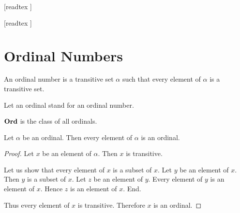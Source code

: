 \documentclass[10pt]{article}
\begin{document}
  \begin{imports}
    \begin{forthel}

      [readtex ]

      [readtex ]

    \end{forthel}
  \end{imports}


  \section{Ordinal Numbers}

  \begin{forthel}
    \begin{definition}
      An ordinal number is a transitive set $\alpha$ such that every element of
      $\alpha$ is a transitive set.
    \end{definition}

    Let an ordinal stand for an ordinal number.
  \end{forthel}

  \begin{forthel}
    \begin{definition}
      $\textbf{Ord}$ is the class of all ordinals.
    \end{definition}
  \end{forthel}

  \begin{forthel}
    \begin{proposition}
      Let $\alpha$ be an ordinal.
      Then every element of $\alpha$ is an ordinal.
    \end{proposition}
    \begin{proof}
      Let $x$ be an element of $\alpha$.
      Then $x$ is transitive.

      Let us show that every element of $x$ is a subset of $x$.
        Let $y$ be an element of $x$.
        Then $y$ is a subset of $x$.
        Let $z$ be an element of $y$.
        Every element of $y$ is an element of $x$.
        Hence $z$ is an element of $x$.
      End.

      Thus every element of $x$ is transitive.
      Therefore $x$ is an ordinal.
    \end{proof}
  \end{forthel}
\end{document}
